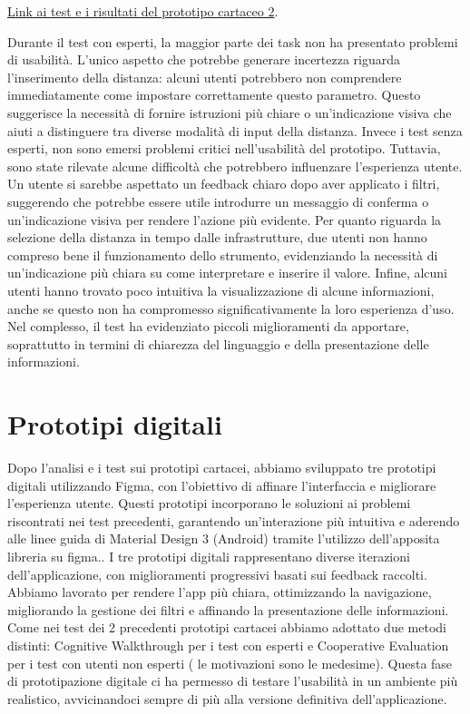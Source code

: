 \href{https://docs.google.com/document/d/1tHGeyCZ8hoAeUjqVQE73V_cnl-hZVUCU8NZMXUOQrx0/edit?tab=t.0#heading=h.8hgxc9gkc90q}{Link ai test e i risultati del prototipo cartaceo 2}.

Durante il test con esperti, la maggior parte dei task non ha presentato problemi di usabilità.
L’unico aspetto che potrebbe generare incertezza riguarda l’inserimento della distanza: alcuni utenti potrebbero non comprendere immediatamente come impostare correttamente questo parametro. Questo suggerisce la necessità di fornire istruzioni più chiare o un’indicazione visiva che aiuti a distinguere tra diverse modalità di input della distanza.
Invece i test senza esperti, non sono emersi problemi critici nell’usabilità del prototipo. Tuttavia, sono state rilevate alcune difficoltà che potrebbero influenzare l’esperienza utente.
Un utente si sarebbe aspettato un feedback chiaro dopo aver applicato i filtri, suggerendo che potrebbe essere utile introdurre un messaggio di conferma o un’indicazione visiva per rendere l’azione più evidente.
Per quanto riguarda la selezione della distanza in tempo dalle infrastrutture, due utenti non hanno compreso bene il funzionamento dello strumento, evidenziando la necessità di un’indicazione più chiara su come interpretare e inserire il valore.
Infine, alcuni utenti hanno trovato poco intuitiva la visualizzazione di alcune informazioni, anche se questo non ha compromesso significativamente la loro esperienza d’uso.
Nel complesso, il test ha evidenziato piccoli miglioramenti da apportare, soprattutto in termini di chiarezza del linguaggio e della presentazione delle informazioni.

\section{Prototipi digitali}
Dopo l'analisi e i test sui prototipi cartacei, abbiamo sviluppato tre prototipi digitali utilizzando Figma, con l’obiettivo di affinare l’interfaccia e migliorare l’esperienza utente. Questi prototipi incorporano le soluzioni ai problemi riscontrati nei test precedenti, garantendo un'interazione più intuitiva e aderendo alle linee guida di Material Design 3 (Android) tramite l’utilizzo dell’apposita libreria su figma..
I tre prototipi digitali rappresentano diverse iterazioni dell’applicazione, con miglioramenti progressivi basati sui feedback raccolti. Abbiamo lavorato per rendere l’app più chiara, ottimizzando la navigazione, migliorando la gestione dei filtri e affinando la presentazione delle informazioni.
Come nei test dei 2 precedenti prototipi cartacei abbiamo adottato due metodi distinti: Cognitive Walkthrough per i test con esperti e Cooperative Evaluation per i test con utenti non esperti ( le motivazioni sono le medesime).
Questa fase di prototipazione digitale ci ha permesso di testare l’usabilità in un ambiente più realistico, avvicinandoci sempre di più alla versione definitiva dell’applicazione.

